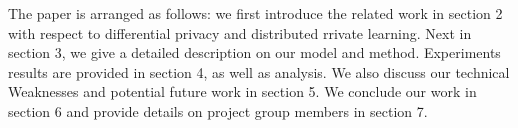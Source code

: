 The paper is arranged as follows: we first introduce the related work in section 2 with respect to differential privacy and distributed rrivate learning. Next in section 3, we give a detailed description on our model and method. Experiments results are provided in section 4, as well as analysis. We also discuss our technical Weaknesses and potential future work in section 5. We conclude our work in section 6 and provide details on project group members in section 7.

